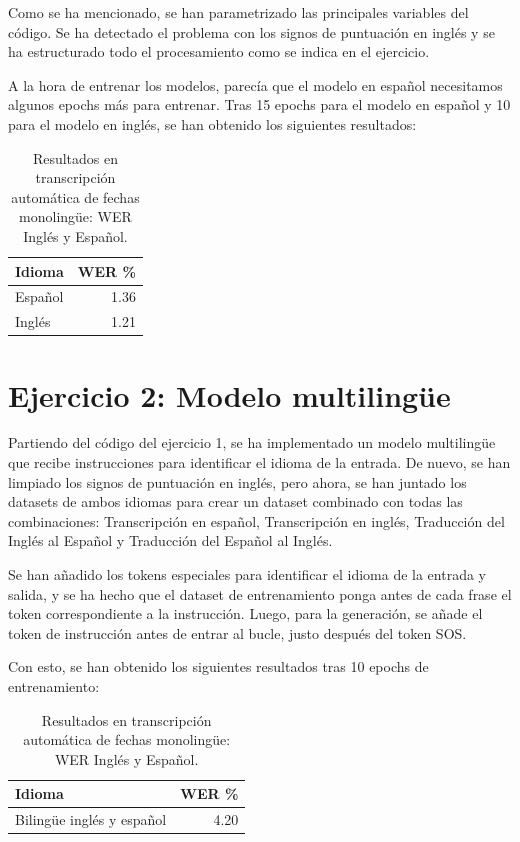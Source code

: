 \documentclass[11pt,spanish,listoffigures,listoftables]{tfgetsinf}
\begin{document}
Como se ha mencionado, se han parametrizado las principales variables del código. Se ha detectado el problema con los signos de puntuación en inglés y se ha estructurado todo el procesamiento como se indica en el ejercicio.

A la hora de entrenar los modelos, parecía que el modelo en español necesitamos algunos epochs más para entrenar. Tras 15 epochs para el modelo en español y 10 para el modelo en inglés, se han obtenido los siguientes resultados:

\begin{table}[H]
\centering
\begin{tabular}{lr}
	\toprule
	\textbf{Idioma} & \textbf{WER \%} \\
	\midrule
	Español & 1.36 \\
	Inglés & 1.21 \\
	\bottomrule
\end{tabular}
\caption{Resultados en transcripción automática de fechas monolingüe: WER Inglés y Español.}
\label{tab:wer_ej1}
\end{table}

\section{Ejercicio 2: Modelo multilingüe}
Partiendo del código del ejercicio 1, se ha implementado un modelo multilingüe que recibe instrucciones para identificar el idioma de la entrada. De nuevo, se han limpiado los signos de puntuación en inglés, pero ahora, se han juntado los datasets de ambos idiomas para crear un dataset combinado con todas las combinaciones: Transcripción en español, Transcripción en inglés, Traducción del Inglés al Español y Traducción del Español al Inglés.

Se han añadido los tokens especiales para identificar el idioma de la entrada y salida, y se ha hecho que el dataset de entrenamiento ponga antes de cada frase el token correspondiente a la instrucción. Luego, para la generación, se añade el token de instrucción antes de entrar al bucle, justo después del token SOS.

Con esto, se han obtenido los siguientes resultados tras 10 epochs de entrenamiento:
\begin{table}[H]
\centering
\begin{tabular}{lr}
	\toprule
	\textbf{Idioma} & \textbf{WER \%} \\
	\midrule
	Bilingüe inglés y español & 4.20 \\
	\bottomrule
\end{tabular}
\caption{Resultados en transcripción automática de fechas monolingüe: WER Inglés y Español.}
\label{tab:wer_ej1}
\end{table}
\end{document}

